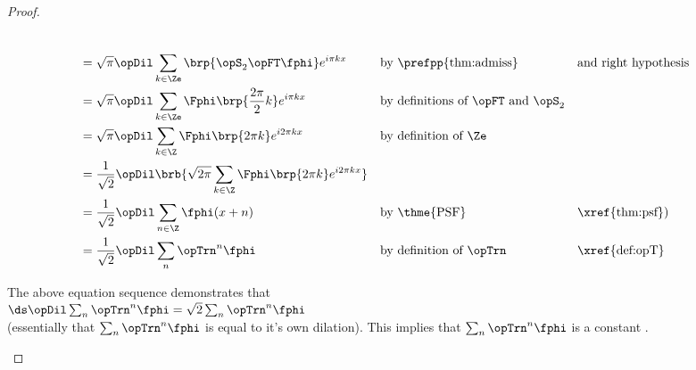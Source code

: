 \begin{proof}
\begin{enumerate}
\begin{align*}
{       }%
  \\&= \sqrt{\pi} \opDil \sum_{k\in\Ze} \brp{\opS_2 \opFT\fphi} e^{i\pi kx}
    && \text{by \prefpp{thm:admiss}}&& \text{and right hypothesis}
  \\&= \sqrt{\pi} \opDil \sum_{k\in\Ze} \Fphi\brp{\frac{2\pi}{2}k} e^{i\pi kx}
    && \text{by definitions of $\opFT$ and $\opS_2$}
  \\&= \sqrt{\pi} \opDil \sum_{k\in\Z} \Fphi\brp{2\pi k} e^{i2\pi kx}
    && \text{by definition of $\Ze$}
  \\&= \frac{1}{\sqrt{2}}\opDil \brb{\sqrt{2\pi} \sum_{k\in\Z} \Fphi\brp{2\pi k} e^{i2\pi kx}}
  \\&= \frac{1}{\sqrt{2}}\opDil \sum_{n\in\Z}\fphi(x+n)
    && \text{by \thme{PSF}} && \text{\xref{thm:psf})}
  \\&= \frac{1}{\sqrt{2}}\opDil \sum_{n}\opTrn^n\fphi
    && \text{by definition of $\opTrn$} && \text{\xref{def:opT}}
\end{align*}

The above equation sequence demonstrates that
  \\\indentx$\ds\opDil\sum_n\opTrn^n\fphi = \sqrt{2}\sum_n\opTrn^n\fphi$\\
(essentially that $\sum_n\opTrn^n\fphi$ is equal to it's own dilation).
This implies that $\sum_n\opTrn^n\fphi$ is a constant .


\end{enumerate}
\end{proof}

